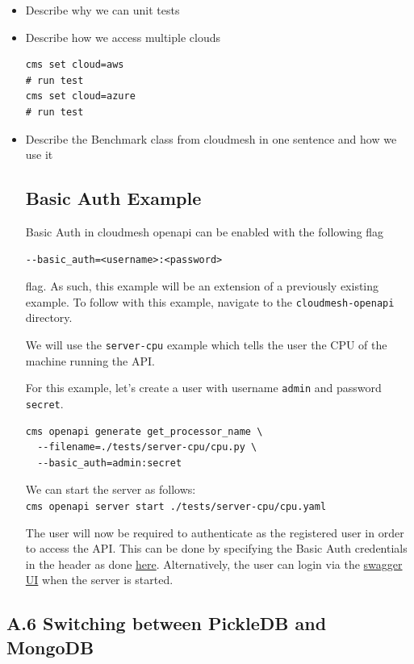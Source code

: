\begin{itemize}
\item
  Describe why we can unit tests
\item
  Describe how we access multiple clouds

\begin{verbatim}
cms set cloud=aws
# run test
cms set cloud=azure
# run test
\end{verbatim}
\item
  Describe the Benchmark class from cloudmesh in one sentence and how we
  use it

  \subsection{Basic Auth
  Example}\label{a.5.-basic-auth-example}

  Basic Auth in cloudmesh openapi can be enabled with the following flag

\begin{verbatim}
--basic_auth=<username>:<password>
\end{verbatim}

  flag. As such, this example will be an extension of a previously
  existing example. To follow with this example, navigate to the
  \texttt{cloudmesh-openapi} directory.

  We will use the \texttt{server-cpu} example which tells the user the
  CPU of the machine running the API.

  For this example, let's create a user with username \texttt{admin} and
  password \texttt{secret}.

\begin{verbatim}
cms openapi generate get_processor_name \
  --filename=./tests/server-cpu/cpu.py \
  --basic_auth=admin:secret
\end{verbatim}

  We can start the server as follows:
  \texttt{cms\ openapi\ server\ start\ ./tests/server-cpu/cpu.yaml}

  The user will now be required to authenticate as the registered user
  in order to access the API. This can be done by specifying the Basic
  Auth credentials in the header as done
  \href{https://developer.mozilla.org/en-US/docs/Web/HTTP/Headers/Authorization}{here}.
  Alternatively, the user can login via the
  \href{http://localhost:8080/cloudmesh/u}{swagger UI} when the server
  is started.
\end{itemize}

\subsection{A.6 Switching between PickleDB and
MongoDB}\label{a.6-switching-between-pickledb-and-mongodb}

